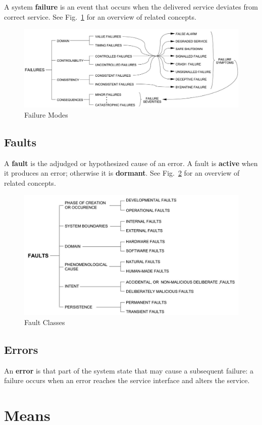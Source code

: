 A system \textbf{failure} is an event that occurs when the delivered service deviates from correct service.
See Fig.~\ref{fig:concepts_fail} for an overview of related concepts.

\begin{figure}
\centering
\includegraphics[width=0.7\linewidth]{concepts_fail}
\caption{Failure Modes}
\label{fig:concepts_fail}
\end{figure}

\subsection{Faults}

A \textbf{fault} is the adjudged or hypothesized cause of an error.
A fault is \textbf{active} when it produces an error; otherwise it is \textbf{dormant}.
See Fig.~\ref{fig:concepts_fault} for an overview of related concepts.

\begin{figure}
\centering
\includegraphics[width=0.7\linewidth]{concepts_fault}
\caption{Fault Classes}
\label{fig:concepts_fault}
\end{figure}

\subsection{Errors}

An \textbf{error} is that part of the system state that may cause a subsequent failure: a failure occurs when an error reaches the service interface and alters the service.

\section{Means}

